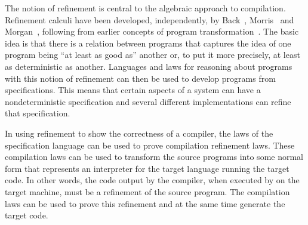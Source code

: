 The notion of refinement is central to the algebraic approach to
compilation.
Refinement calculi have been developed, independently, by
Back~\cite{back1981}, Morris~\cite{morris1987} and
Morgan~\cite{morgan1990}, following from earlier concepts of program
transformation~\cite{bauer1976, balzer1976, standish1976, arsac1979}.
The basic idea is that there is a relation between programs that
captures the idea of one program being ``at least as good as'' another
or, to put it more precisely, at least as deterministic as another.
Languages and laws for reasoning about programs with this notion of
refinement can then be used to develop programs from specifications.
This means that certain aspects of a system can have a
nondeterministic specification and several different implementations
can refine that specification.

In using refinement to show the correctness of a compiler, the laws of
the specification language can be used to prove compilation refinement
laws.
These compilation laws can be used to transform the source programs
into some normal form that represents an interpreter for the target
language running the target code.
In other words, the code output by the compiler, when executed by on
the target machine, must be a refinement of the source program.
The compilation laws can be used to prove this refinement and at the
same time generate the target code.

